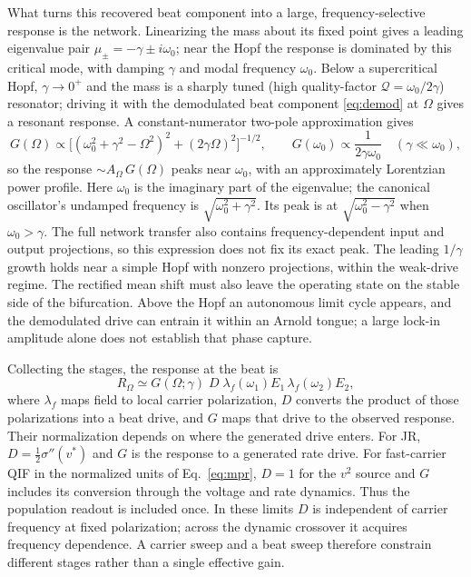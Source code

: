 \documentclass[11pt,a4paper]{article}
\newcommand{\Sig}{\sigma}
\newcommand{\half}{\tfrac{1}{2}}
\providecommand{\DIFaddtex}[1]{{\protect\color{blue} \sf #1}} %
\providecommand{\DIFaddbegin}{} %
\providecommand{\DIFaddend}{} %
\providecommand{\DIFadd}[1]{\texorpdfstring{\DIFaddtex{#1}}{#1}} %
\begin{document}
What turns this recovered beat component into a large, frequency-selective response is
the network. Linearizing the mass about its fixed point gives a leading eigenvalue pair
$\mu_\pm=-\gamma\pm i\omega_0$; near the Hopf the response is dominated by this critical
mode, with damping $\gamma$ and modal frequency $\omega_0$.
Below a supercritical Hopf, $\gamma\to0^+$ and
the mass is a sharply tuned (high quality-factor $\mathcal{Q}=\omega_0/2\gamma$) resonator;
driving it with the demodulated beat component
\eqref{eq:demod} at $\Omega$ gives a resonant response. A constant-numerator
two-pole approximation gives
\begin{equation}
G(\Omega)\propto\big[(\omega_0^2+\gamma^2-\Omega^2)^2+(2\gamma\Omega)^2\big]^{-1/2},
\qquad G(\omega_0)\propto\frac{1}{2\gamma\omega_0}
\quad(\gamma\ll\omega_0),
\label{eq:gain}
\end{equation}
so the response $\sim A_\Omega\,G(\Omega)$ peaks near $\omega_0$, with an
approximately Lorentzian power profile. Here $\omega_0$ is the imaginary part of
the eigenvalue; the canonical oscillator's undamped frequency is
$\sqrt{\omega_0^2+\gamma^2}$. Its peak is at $\sqrt{\omega_0^2-\gamma^2}$ when
$\omega_0>\gamma$. The full network transfer also contains frequency-dependent
input and output projections, so this expression does not fix its exact peak.
The leading $1/\gamma$ growth holds near a simple Hopf with nonzero projections,
within the weak-drive regime. \DIFaddbegin \DIFadd{The rectified mean shift must also leave the operating
state on the stable side of the bifurcation. }\DIFaddend Above the Hopf an autonomous limit cycle appears,
and the demodulated drive can entrain it within an Arnold tongue; a large lock-in
amplitude alone does not establish that phase capture.

Collecting the stages, the response at the beat is
\begin{equation}
R_\Omega\simeq G(\Omega;\gamma)\;D\;\lambda_f(\omega_1)E_1\,\lambda_f(\omega_2)E_2 ,
\label{eq:receiver}
\end{equation}
where $\lambda_f$ maps field to local carrier polarization, $D$ converts the
product of those polarizations into a beat drive, and $G$ maps that drive to the
observed response. Their normalization depends on where the generated drive enters.
For JR, $D=\half\Sig''(v^*)$ and $G$ is the response to a generated rate drive.
For fast-carrier QIF in the normalized units of Eq.~\eqref{eq:mpr}, $D=1$ for
the $v^2$ source and $G$ includes its conversion through the voltage and rate
dynamics. Thus the population readout is included once. In these limits $D$ is
independent of carrier frequency at fixed polarization; across the dynamic
crossover it acquires frequency dependence. A carrier sweep and a beat sweep
therefore constrain different stages rather than a single effective gain.
\end{document}
